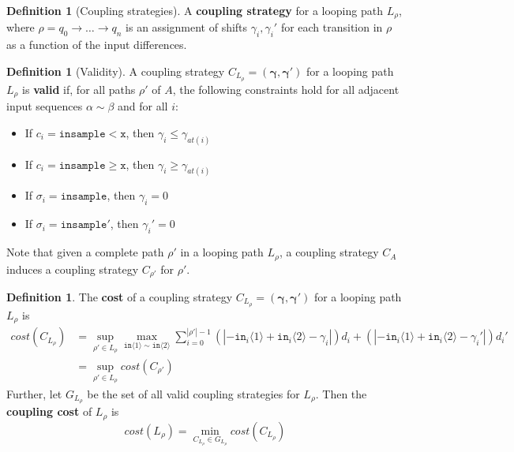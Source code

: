 \documentclass[12pt]{article}
\newcommand{\gguard}[1][x]{\texttt{insample}\geq #1}
\newcommand{\lguard}[1][x]{\texttt{insample} < #1}
\newcommand{\brangle}[1]{\langle #1 \rangle}
\theoremstyle{definition}
\newtheorem{defn}[thm]{Definition}
\begin{document}
\begin{defn}[Coupling strategies]
    A \textbf{coupling strategy} for a looping path $L_\rho$, where $\rho=q_0\to\ldots \to q_n$ is an assignment of shifts $\gamma_i, \gamma_i'$ for each transition in $\rho$ as a function of the input differences. 
\end{defn}

\begin{defn}[Validity]
    A coupling strategy $C_{L_\rho}=(\bm{\gamma}, \bm{\gamma}')$ for a looping path $L_\rho$ is \textbf{valid} if, for all paths $\rho'$ of $A$, the following constraints hold for all adjacent input sequences $\alpha\sim\beta$ and for all $i$:
    \begin{itemize}
        \item If $c_i = \lguard[\texttt{x}]$, then $\gamma_i\leq\gamma_{at(i)}$
        \item If $c_i = \gguard[\texttt{x}]$, then $\gamma_i\geq\gamma_{at(i)}$
        \item If $\sigma_i = \texttt{insample}$, then $\gamma_i=0$
        \item If $\sigma_i = \texttt{insample}'$, then $\gamma_i'=0$
    \end{itemize}
\end{defn}

Note that given a complete path $\rho'$ in a looping path $L_\rho$, a coupling strategy $C_A$ induces a coupling strategy $C_{\rho'}$ for $\rho'$.

\begin{defn}
    The \textbf{cost} of a coupling strategy $C_{L_\rho} = (\bm{\gamma}, \bm{\gamma}')$ for a looping path $L_\rho$ is \begin{align*}
    cost(C_{L_\rho}) &= \sup_{\rho'\in L_{\rho}}\max_{\texttt{in}\brangle{1}\sim \texttt{in}\brangle{2}} \sum_{i=0}^{|\rho'|-1}(|-\texttt{in}_i\brangle{1}+\texttt{in}_i\brangle{2}-\gamma_i|)d_i+(|-\texttt{in}_i\brangle{1}+\texttt{in}_i\brangle{2}-\gamma_i'|)d_i'\\
    &=\sup_{\rho'\in L_\rho}cost(C_{\rho'})
\end{align*}
    Further, let $G_{L_\rho}$ be the set of all valid coupling strategies for $L_\rho$. Then the \textbf{coupling cost} of $L_\rho$ is \[
        cost(L_\rho) = \min_{C_{L_\rho}\in G_{L_\rho}}cost(C_{L_\rho})
    \]
\end{defn}
\end{document}
